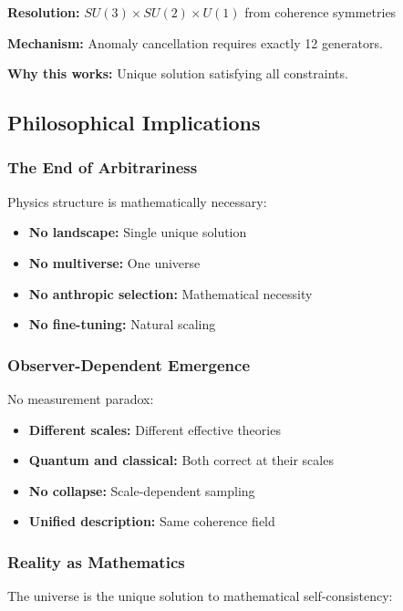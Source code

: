 \documentclass[11pt]{article}
\theoremstyle{definition}
\begin{document}
\textbf{Resolution:} $SU(3) \times SU(2) \times U(1)$ from coherence symmetries

\textbf{Mechanism:} Anomaly cancellation requires exactly 12 generators.

\textbf{Why this works:} Unique solution satisfying all constraints.

\subsection{Philosophical Implications}

\subsubsection{The End of Arbitrariness}

Physics structure is mathematically necessary:

\begin{itemize}
\item \textbf{No landscape:} Single unique solution
\item \textbf{No multiverse:} One universe
\item \textbf{No anthropic selection:} Mathematical necessity
\item \textbf{No fine-tuning:} Natural scaling
\end{itemize}

\subsubsection{Observer-Dependent Emergence}

No measurement paradox:

\begin{itemize}
\item \textbf{Different scales:} Different effective theories
\item \textbf{Quantum and classical:} Both correct at their scales
\item \textbf{No collapse:} Scale-dependent sampling
\item \textbf{Unified description:} Same coherence field
\end{itemize}

\subsubsection{Reality as Mathematics}

The universe is the unique solution to mathematical self-consistency:
\end{document}
